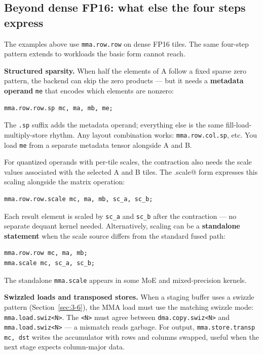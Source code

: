 \subsection*{Beyond dense FP16: what else the four steps express}

The examples above use \texttt{mma.row.row} on dense FP16 tiles. The same four-step pattern extends to workloads the basic form cannot reach.

\textbf{Structured sparsity.} When half the elements of A follow a fixed sparse zero pattern, the backend can skip the zero products --- but it needs a \textbf{metadata operand} \texttt{me} that encodes which elements are nonzero:

\begin{lstlisting}[language=croqtile,caption={A sparse contraction}]
mma.row.row.sp mc, ma, mb, me;
\end{lstlisting}

The \texttt{.sp} suffix adds the metadata operand; everything else is the same fill-load-multiply-store rhythm. Any layout combination works: \texttt{mma.row.col.sp}, etc. You load \texttt{me} from a separate metadata tensor alongside A and B.

For quantized operands with per-tile scales, the contraction also needs the scale values associated with the selected A and B tiles. The \co@.scale@ form expresses this scaling alongside the matrix operation:

\begin{lstlisting}[language=croqtile,caption={A scaled contraction}]
mma.row.row.scale mc, ma, mb, sc_a, sc_b;
\end{lstlisting}

Each result element is scaled by \texttt{sc\_a} and \texttt{sc\_b} after the contraction --- no separate dequant kernel needed. Alternatively, scaling can be a \textbf{standalone statement} when the scale source differs from the standard fused path:

\begin{lstlisting}[language=croqtile,caption={Another contraction layout}]
mma.row.row mc, ma, mb;
mma.scale mc, sc_a, sc_b;
\end{lstlisting}

The standalone \texttt{mma.scale} appears in some MoE and mixed-precision kernels.

\textbf{Swizzled loads and transposed stores.} When a staging buffer uses a swizzle pattern (Section~\ref{sec:3-6}), the MMA load must use the matching swizzle mode: \texttt{mma.\allowbreak{}load.\allowbreak{}swiz\textless{}N\textgreater{}}. The \texttt{\textless{}N\textgreater{}} must agree between \texttt{dma.\allowbreak{}copy.\allowbreak{}swiz\textless{}N\textgreater{}} and \texttt{mma.\allowbreak{}load.\allowbreak{}swiz\textless{}N\textgreater{}} --- a mismatch reads garbage. For output, \texttt{mma.\allowbreak{}store.\allowbreak{}transp mc, dst} writes the accumulator with rows and columns swapped, useful when the next stage expects column-major data.


